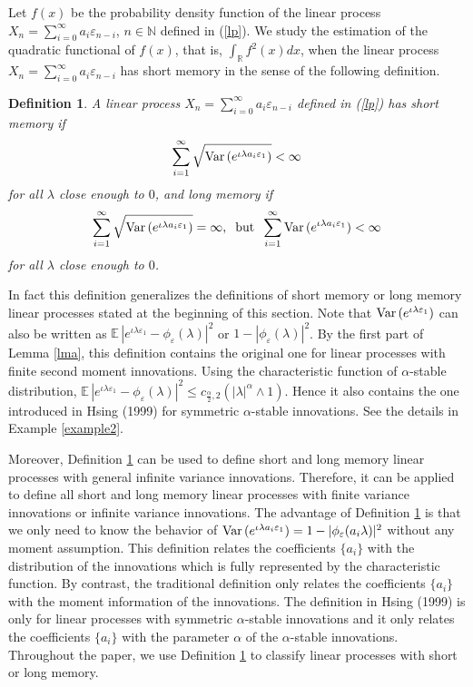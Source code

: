 \documentclass[11pt]{article}
\newtheorem{definition}{Definition}[section]
\def\R{{\mathbb R}}
\def\E{{{\mathbb E}\,}}
\def\Var{{\mathop {{\rm Var\, }}}}
\begin{document}
Let $f(x)$ be the probability density function of the linear process $X_n=\sum\limits_{i=0}^\infty a_i\varepsilon_{n-i}$, $n\in \mathbb{N}$ defined in (\ref{lp}). We study the estimation of the quadratic functional of $f(x)$, that is, $\int_{\R} f^2(x)dx$, when the linear process $X_n=\sum\limits_{i=0}^\infty a_i\varepsilon_{n-i}$ has short memory in the sense of the following definition. 
\begin{definition}\label{rmk5}
A linear process $X_n=\sum\limits_{i=0}^\infty a_i \varepsilon_{n-i}$ defined in (\ref{lp}) has short memory if 
\[
\sum\limits^{\infty}_{i=1} \sqrt{\Var(e^{\iota  \lambda a_i \varepsilon_1})}<\infty
\]
for all $\lambda$ close enough to $0$,  and long memory if 
\[
\sum\limits^{\infty}_{i=1} \sqrt{\Var(e^{\iota  \lambda a_i \varepsilon_1})}=\infty, \;\;\text{but} \;\;\sum\limits^{\infty}_{i=1} \Var(e^{\iota  \lambda a_i \varepsilon_1})<\infty
\]
for all $\lambda$ close enough to $0$.
\end{definition} 
In fact this definition generalizes the definitions of short memory or long memory linear processes
stated at the beginning of this section. Note that $\Var(e^{\iota  \lambda \varepsilon_1})$ can also be written as $\E |e^{\iota  \lambda \varepsilon_1}-\phi_\varepsilon(\lambda)|^2$ or $1-|\phi_\varepsilon(\lambda)|^2$.   By the first part of Lemma \ref{lma}, this definition contains the original one for linear processes with finite second moment innovations. Using the characteristic function of $\alpha$-stable distribution, $\E|e^{\iota \lambda \varepsilon_1}-\phi_{\varepsilon}(\lambda)|^{2}\leq c_{\frac{\alpha}{2},2} \left(|\lambda|^{\alpha}\wedge 1\right)$. Hence it also contains the one introduced in Hsing (1999) for symmetric $\alpha$-stable innovations. See the details in  Example \ref{example2}. 

Moreover, Definition \ref{rmk5} can be used to define short and long memory linear processes with general infinite variance innovations. Therefore, it can be applied to define all short and long memory linear processes with finite  variance innovations or infinite variance innovations. The advantage of Definition \ref{rmk5} is that we only need to know the behavior of $\Var(e^{\iota \lambda a_i\varepsilon_1})=1-|\phi_\varepsilon(a_i\lambda)|^2$ without any moment assumption. This definition relates the coefficients $\{a_i\}$ with the distribution of the innovations which is fully represented by the characteristic function. By contrast, the traditional definition only relates the coefficients $\{a_i\}$ with the moment information of the innovations. The definition in Hsing (1999) is only for linear processes with symmetric $\alpha$-stable innovations and it only relates the coefficients $\{a_i\}$ with the parameter $\alpha$ of the $\alpha$-stable innovations. Throughout the paper, we use Definition \ref{rmk5} to classify linear processes with short or long memory. 
\end{document}
